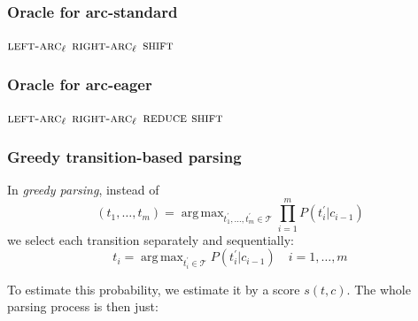 \documentclass[t]{beamer}
\DeclareMathOperator*{\argmax}{arg\,max}
\begin{document}
\begin{frame}
    \frametitle{Oracle for arc-standard}
    \begin{algorithmic}[0]
            \RETURN $\textsc{left-arc}_\ell$
            \RETURN $\textsc{right-arc}_\ell$
        \ELSE
            \RETURN $\textsc{shift}$
        \ENDIF
    \ENDWHILE
    \end{algorithmic}
\end{frame}

\begin{frame}
    \frametitle{Oracle for arc-eager}
    \begin{algorithmic}[0]
            \RETURN $\textsc{left-arc}_\ell$
            \RETURN $\textsc{right-arc}_\ell$
            \RETURN $\textsc{reduce}$
        \ELSE
            \RETURN $\textsc{shift}$
        \ENDIF
    \ENDWHILE
    \end{algorithmic}
\end{frame}

\begin{frame}
    \frametitle{Greedy transition-based parsing}
    In \textit{greedy parsing}, instead of    
    \[
    (t_1,\ldots,t_m)=\argmax_{t^\prime_1,\ldots,t^\prime_m \in \mathcal{T}} \prod_{i=1}^mP(t^\prime_i|c_{i-1})
    \]
    we select each transition separately and sequentially:
    \[
    t_i = \argmax_{t^\prime_i \in \mathcal{T}} P(t^\prime_i|c_{i-1}) \quad i=1,\ldots,m
    \]
    
    \pause\vfill
    
    To estimate this probability, we estimate it by a score $s(t, c)$.
    The whole parsing process is then just:
    \begin{algorithmic}[0]
        \STATE{$c\leftarrow\Big(\argmax_{t\in\mathcal{T}}s(t,c)\Big)(c)$}
    \ENDWHILE
    \end{algorithmic}
\end{frame}
\end{document}

